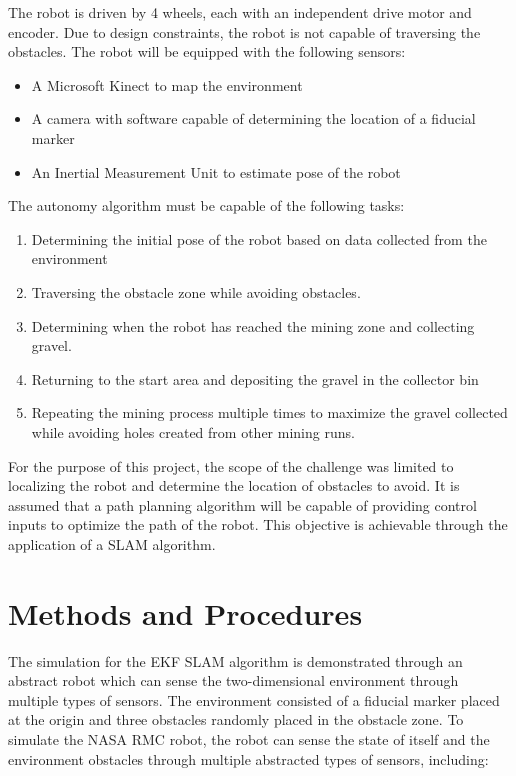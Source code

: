 \documentclass[journal]{IEEEtran}
\begin{document}
The robot is driven by 4 wheels, each with an independent drive motor and encoder. Due to 
design constraints, the robot is not capable of traversing the obstacles. The robot will be 
equipped with the following sensors:

\begin{itemize}
 \item A Microsoft Kinect to map the environment
 \item A camera with software capable of determining the location of a fiducial marker
 \item An Inertial Measurement Unit to estimate pose of the robot
\end{itemize}

The autonomy algorithm must be capable of the following tasks:

\begin{enumerate}
 \item Determining the initial pose of the robot based on data collected from the environment
 \item Traversing the obstacle zone while avoiding obstacles. 
 \item Determining when the robot has reached the mining zone and collecting gravel.
 \item Returning to the start area and depositing the gravel in the collector bin
 \item Repeating the mining process multiple times to maximize the gravel collected while 
 avoiding holes created from other mining runs.
\end{enumerate}

For the purpose of this project, the scope of the challenge was limited to localizing the robot
and determine the location of obstacles to avoid. It is assumed that a path planning algorithm 
will be capable of providing control inputs to optimize the path of the robot. This objective is 
achievable through the application of a SLAM algorithm.



\section{Methods and Procedures}

The simulation for the EKF SLAM algorithm is demonstrated through an abstract robot which 
can sense the two-dimensional environment through multiple types of sensors. The environment consisted of a fiducial marker placed at the origin and three obstacles randomly placed in the obstacle zone. To 
simulate the NASA RMC robot, the robot can sense the state of itself and the environment 
obstacles through multiple abstracted types of sensors, including:
\end{document}
